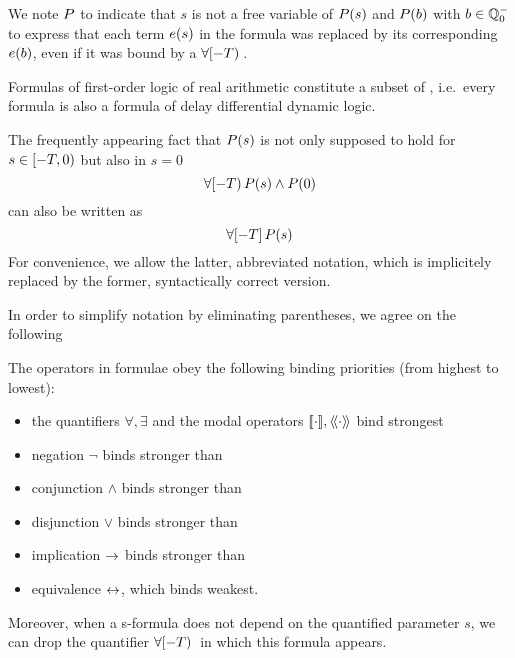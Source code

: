     We note $P$ to indicate that $s$ is not a free variable of $P(s)$ and $P(b)$ with $b\in\mathbb{Q}^-_0$ to express that each term $e(s)$ in the formula was replaced by its corresponding $e(b)$, even if it was bound by a $\forall [-T){\,}$.
    
    Formulas of first-order logic of real arithmetic constitute a subset of \ddL, i.e.\ every \FOLR formula is also a formula of delay differential dynamic logic.

    \begin{convention}
        The frequently appearing fact that $P(s)$ is not only supposed to hold for $s\in[-T,0)$ but also in $s=0$
        \begin{equation*}
            \forall [-T){\,} P(s)\land P(0)
        \end{equation*}
        can also be written as
        \begin{equation*}
            \forall [-T]{\,} P(s)
        \end{equation*}
        For convenience, we allow the latter, abbreviated notation, which is implicitely replaced by the former, syntactically correct version.
    \end{convention}

    In order to simplify notation by eliminating parentheses, we agree on the following
    \begin{convention}
        The operators in \ddL formulae obey the following binding priorities (from highest to lowest):
        \begin{itemize}
            \item the quantifiers $\forall,\exists$ and the modal operators $\dbox{\cdot}{},\ddiamond{\cdot}{}$ bind strongest
            \item negation $\lnot$ binds stronger than
            \item conjunction $\land$ binds stronger than 
            \item disjunction $\lor$ binds stronger than
            \item implication $\rightarrow$ binds stronger than
            \item equivalence $\leftrightarrow$, which binds weakest.
        \end{itemize}
    \end{convention}

    Moreover, when a s-formula does not depend on the quantified parameter $s$, we can drop the quantifier $\forall [-T){\,}$ in which this formula appears.

